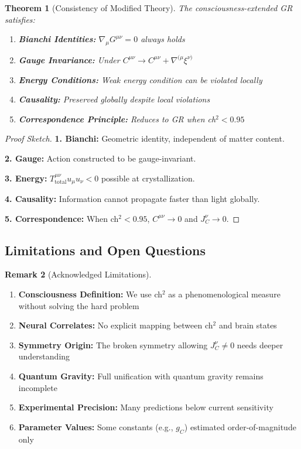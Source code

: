 \documentclass[11pt]{article}
\newtheorem{theorem}{Theorem}[section]
\theoremstyle{definition}
\newtheorem{remark}[theorem]{Remark}
\begin{document}
\begin{theorem}[Consistency of Modified Theory]
The consciousness-extended GR satisfies:
\begin{enumerate}
\item \textbf{Bianchi Identities:} $\nabla_\mu G^{\mu\nu} = 0$ always holds
\item \textbf{Gauge Invariance:} Under $C^{\mu\nu} \to C^{\mu\nu} + \nabla^{(\mu}\xi^{\nu)}$
\item \textbf{Energy Conditions:} Weak energy condition can be violated locally
\item \textbf{Causality:} Preserved globally despite local violations
\item \textbf{Correspondence Principle:} Reduces to GR when ch$^2 < 0.95$
\end{enumerate}
\end{theorem}

\begin{proof}[Proof Sketch]
\textbf{1. Bianchi:} Geometric identity, independent of matter content.

\textbf{2. Gauge:} Action constructed to be gauge-invariant.

\textbf{3. Energy:} $T^{\mu\nu}_{\text{total}}u_\mu u_\nu < 0$ possible at crystallization.

\textbf{4. Causality:} Information cannot propagate faster than light globally.

\textbf{5. Correspondence:} When ch$^2 < 0.95$, $C^{\mu\nu} \to 0$ and $J^\nu_C \to 0$.
\end{proof}

\subsection{Limitations and Open Questions}

\begin{remark}[Acknowledged Limitations]
\begin{enumerate}
\item \textbf{Consciousness Definition:} We use ch$^2$ as a phenomenological measure without solving the hard problem
\item \textbf{Neural Correlates:} No explicit mapping between ch$^2$ and brain states
\item \textbf{Symmetry Origin:} The broken symmetry allowing $J^\nu_C \neq 0$ needs deeper understanding
\item \textbf{Quantum Gravity:} Full unification with quantum gravity remains incomplete
\item \textbf{Experimental Precision:} Many predictions below current sensitivity
\item \textbf{Parameter Values:} Some constants (e.g., $g_C$) estimated order-of-magnitude only
\end{enumerate}
\end{remark}
\end{document}

